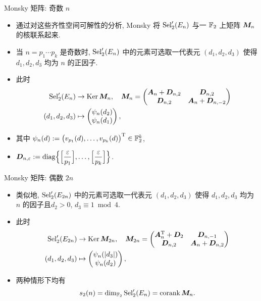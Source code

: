 \documentclass[aspectratio=169,handout]{ctexbeamer}
\renewcommand\aleg[2]{\Bigl[\dfrac{{#1}}{#2}\Bigr]}
\begin{document}
\begin{frame}{Monsky 矩阵: 奇数 $n$}
  \begin{itemize}
    \item 通过对这些齐性空间可解性的分析, Monsky 将 ${\mathrm{Sel}}_2'(E_n)$ 与一 ${\mathbb{F}}_2$ 上矩阵 ${\boldsymbol{M}}_n$ 的核联系起来.
    \item 当 $n=p_1\cdots p_k$ 是奇数时, ${\mathrm{Sel}}_2'(E_n)$ 中的元素可选取一代表元 $(d_1,d_2,d_3)$ 使得 $d_1,d_2, d_3$ 均为 $n$ 的正因子.
    \item 此时
    \[
      \begin{aligned}
        {\mathrm{Sel}}_2'(E_n)&\rightarrow\operatorname{Ker}{\boldsymbol{M}}_n,\quad {\boldsymbol{M}}_n=\begin{pmatrix}
          {\boldsymbol{A}}_n+{\boldsymbol{D}}_{n,2}&{\boldsymbol{D}}_{n,2}\\
          {\boldsymbol{D}}_{n,2}&{\boldsymbol{A}}_n+{\boldsymbol{D}}_{n,-2}
        \end{pmatrix}\\
        (d_1,d_2,d_3)&\mapsto\begin{pmatrix}
          \psi_n(d_2)\\ \psi_n(d_1)
        \end{pmatrix},
      \end{aligned}
    \]
    \item 其中 $\psi_n(d):=\bigl(v_{p_1}(d),\dots,v_{p_k}(d)\bigr)^{\mathrm{T}}\in{\mathbb{F}}_2^k$,
    \item $\bfD_{n,\varepsilon}:=\diag\Bigl\{\aleg{\varepsilon}{p_1},\dots,\aleg{\varepsilon}{p_k}\Bigr\}$.
  \end{itemize}
\end{frame}


\begin{frame}{Monsky 矩阵: 偶数 $2n$}
  \begin{itemize}
    \item 类似地, ${\mathrm{Sel}}_2'(E_{2n})$ 中的元素可选取一代表元 $(d_1,d_2,d_3)$ 使得 $d_1,d_2, d_3$ 均为 $n$ 的因子且$d_2>0$, $d_3\equiv1\bmod4$.
    \item 此时
    \[
      \begin{aligned}
        {\mathrm{Sel}}_2'(E_{2n})&\rightarrow\operatorname{Ker}{\boldsymbol{M}}_{2n},\quad {\boldsymbol{M}}_{2n}=\begin{pmatrix}
          {\boldsymbol{A}}_n^{\mathrm{T}}+{\boldsymbol{D}}_2&{\boldsymbol{D}}_{n,-1}\\
          {\boldsymbol{D}}_{n,2}&{\boldsymbol{A}}_n+{\boldsymbol{D}}_{n,2}
        \end{pmatrix}\\
        (d_1,d_2,d_3)&\mapsto\begin{pmatrix}
          \psi_n(|d_3|)\\ \psi_n(d_2)
        \end{pmatrix},
      \end{aligned}
    \]
    \item 两种情形下均有
    \[
      s_2(n)=\dim_{{\mathbb{F}}_2}{\mathrm{Sel}}_2'(E_n)=\operatorname{corank} {\boldsymbol{M}}_n.
    \]
  \end{itemize}
\end{frame}
\end{document}

